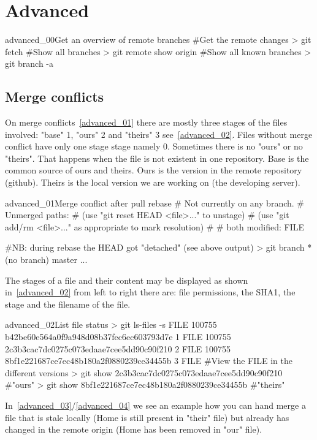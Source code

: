 \section{Advanced}
\begin{codelisting}{advanced_00}{Get an overview of remote branches}
#Get the remote changes
> git fetch
#Show all branches
> git remote show origin
#Show all known branches
> git branch -a
\end{codelisting}
\subsection{Merge conflicts}
On merge conflicts~\ref{advanced_01} there are mostly three stages of the files involved: "base" 1, "ours" 2 and "theirs" 3 see~\ref{advanced_02}. Files without merge conflict have only one stage stage namely 0. Sometimes there is no "ours" or no "theirs". That happens when the file is not existent in one repository. Base is the common source of ours and theirs. Ours is the version in the remote repository (github). Theirs is the local version we are working on (the developing server).
\begin{codelisting}{advanced_01}{Merge conflict after pull rebase}
# Not currently on any branch.
# Unmerged paths:
#   (use "git reset HEAD <file>..." to unstage)
#   (use "git add/rm <file>..." as appropriate to mark resolution)
#
#       both modified:    FILE

#NB: during rebase the HEAD got "detached" (see above output)
> git branch
* (no branch)
  master
...
\end{codelisting}
The stages of a file and their content may be displayed as shown in~\ref{advanced_02} from left to right there are: file permissions, the SHA1, the stage and the filename of the file.
\begin{codelisting}{advanced_02}{List file status}
> git ls-files -s FILE
100755 b42be60e564a0f9a948d08b37fec6ec603793d7e 1       FILE
100755 2c3b3cac7dc0275c073edaae7cee5dd90c90f210 2       FILE
100755 8bf1e221687ce7ec48b180a2f0880239ce34455b 3       FILE
#View the FILE in the different versions
> git show 2c3b3cac7dc0275c073edaae7cee5dd90c90f210 #"ours"
> git show 8bf1e221687ce7ec48b180a2f0880239ce34455b #"theirs"
\end{codelisting}
In~\ref{advanced_03}/\ref{advanced_04} we see an example how you can hand merge a file that is stale locally (Home is still present in "their" file) but already has changed in the remote origin (Home has been removed in "our" file).
